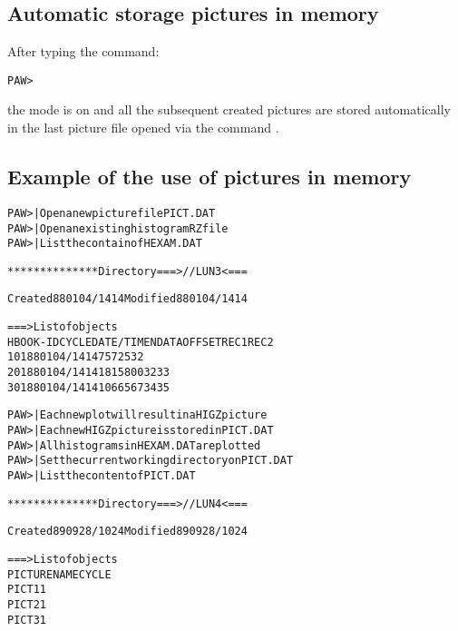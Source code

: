 \newpage

\subsection{Automatic storage pictures in memory}
After typing the command:
\begin{alltt}
PAW > 
\end{alltt}
the  mode is on and all the subsequent created pictures are stored
automatically in the last picture file opened via the command 
.

\subsection*{Example of the use of pictures in memory}
\begin{alltt}
PAW >     | Open a new picture file PICT.DAT
PAW >        | Open an existing histogram RZ file
PAW >                         | List the contain of HEXAM.DAT
 
 ************** Directory ===> //LUN3 <===
 
                  Created 880104/1414  Modified 880104/1414
 
 ===> List of objects
     HBOOK-ID  CYCLE   DATE/TIME   NDATA   OFFSET    REC1    REC2
         10       1   880104/1414     75     725      32
         20       1   880104/1414   1815     800      32      33
         30       1   880104/1414   1066     567      34      35
 
PAW >        | Each new plot will result in a HIGZ picture
PAW >   | Each new HIGZ picture is stored in PICT.DAT
PAW >    | All histograms in HEXAM.DAT are plotted
PAW >    | Set the current working directory on PICT.DAT
PAW >           | List the content of PICT.DAT
 
 ************** Directory ===> //LUN4 <===
 
                  Created 890928/1024  Modified 890928/1024
 
 ===> List of objects
               PICTURE   NAME                          CYCLE
     PICT1                                                1
     PICT2                                                1
     PICT3                                                1
\end{alltt}

